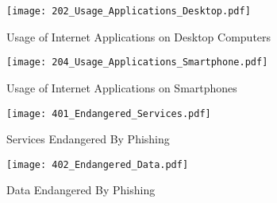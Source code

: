 \begin{figure}[hHtbp]
\centering
\texttt{[image: 202\_Usage\_Applications\_Desktop.pdf]}%
\caption{Usage of Internet Applications on Desktop Computers}%
\label{fig:desktop_apps}%
\end{figure}

\begin{figure}[hHtbp]
\texttt{[image: 204\_Usage\_Applications\_Smartphone.pdf]}%
\caption{Usage of Internet Applications on Smartphones}%
\label{fig:smartphone_apps}%
\end{figure}

\begin{figure}[hHtbp]
\texttt{[image: 401\_Endangered\_Services.pdf]}%
\caption{Services Endangered By Phishing}%
\label{fig:endangered_services}%
\end{figure}

\begin{figure}[hHtbp]
\texttt{[image: 402\_Endangered\_Data.pdf]}%
\caption{Data Endangered By Phishing}%
\label{fig:endangered_data}%
\end{figure}
